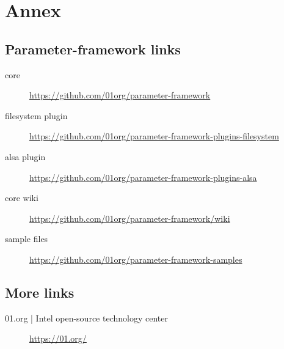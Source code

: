 \chapter*{Annex}\label{chap:annex}

\section*{Parameter-framework links}
\begin{description}
    \item[core] \url{https://github.com/01org/parameter-framework}
    \item[filesystem plugin] \url{https://github.com/01org/parameter-framework-plugins-filesystem}
    \item[alsa plugin] \url{https://github.com/01org/parameter-framework-plugins-alsa}
    \item[core wiki] \url{https://github.com/01org/parameter-framework/wiki}
    \item[sample files] \url{https://github.com/01org/parameter-framework-samples}
\end{description}

\section*{More links}
\begin{description}
    \item[01.org | Intel open-source technology center] \url{https://01.org/}
\end{description}
